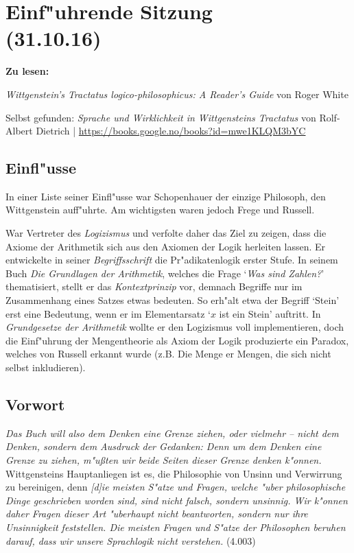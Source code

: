\documentclass[]{scrartcl}
\begin{document}
\section{Einf"uhrende Sitzung\\(31.10.16)}

\textbf{Zu lesen:} 

\emph{Wittgenstein's Tractatus logico-philosophicus: A Reader's Guide} von Roger White

Selbst gefunden: 
\emph{Sprache und Wirklichkeit in Wittgensteins Tractatus} von Rolf-Albert Dietrich | \url{https://books.google.no/books?id=mwe1KLQM3bYC}

\subsection{Einfl"usse}

In einer Liste seiner Einfl"usse war Schopenhauer der einzige Philosoph, den Wittgenstein auff"uhrte. Am wichtigsten waren jedoch Frege und Russell.

\begin{description}[leftmargin=!,labelwidth=\widthof{\bfseries 2}]
  \item[Frege] War Vertreter des \emph{Logizismus} und verfolte daher das Ziel zu zeigen, dass die Axiome der Arithmetik sich aus den Axiomen der Logik herleiten lassen. Er entwickelte in seiner \emph{Begriffsschrift} die Pr"adikatenlogik erster Stufe. In seinem Buch \emph{Die Grundlagen der Arithmetik}, welches die Frage `\emph{Was sind Zahlen?}' thematisiert, stellt er das \emph{Kontextprinzip} vor, demnach Begriffe nur im Zusammenhang eines Satzes etwas bedeuten. So erh"alt etwa der Begriff `Stein' erst eine Bedeutung, wenn er im Elementarsatz `$x$ ist ein Stein' auftritt. In \emph{Grundgesetze der Arithmetik} wollte er den Logizismus voll implementieren, doch die Einf"uhrung der Mengentheorie als Axiom der Logik produzierte ein Paradox, welches von Russell erkannt wurde (z.B. Die Menge er Mengen, die sich nicht selbst inkludieren).
  \item[Russell] 
\end{description}

\subsection{Vorwort}

\emph{Das Buch will also dem Denken eine Grenze ziehen, oder vielmehr – nicht dem Denken, sondern dem Ausdruck der Gedanken: Denn um dem Denken eine Grenze zu ziehen, m"ußten wir beide Seiten dieser Grenze denken k"onnen.} Wittgensteins Hauptanliegen ist es, die Philosophie von Unsinn und Verwirrung zu bereinigen, denn \emph{[d]ie meisten S"atze und Fragen, welche "uber philosophische Dinge geschrieben worden sind, sind nicht falsch, sondern unsinnig. Wir k"onnen daher Fragen dieser Art "uberhaupt nicht beantworten, sondern nur ihre Unsinnigkeit feststellen. Die meisten Fragen und S"atze der Philosophen beruhen darauf, dass wir unsere Sprachlogik nicht verstehen.} (4.003)
\end{document}

